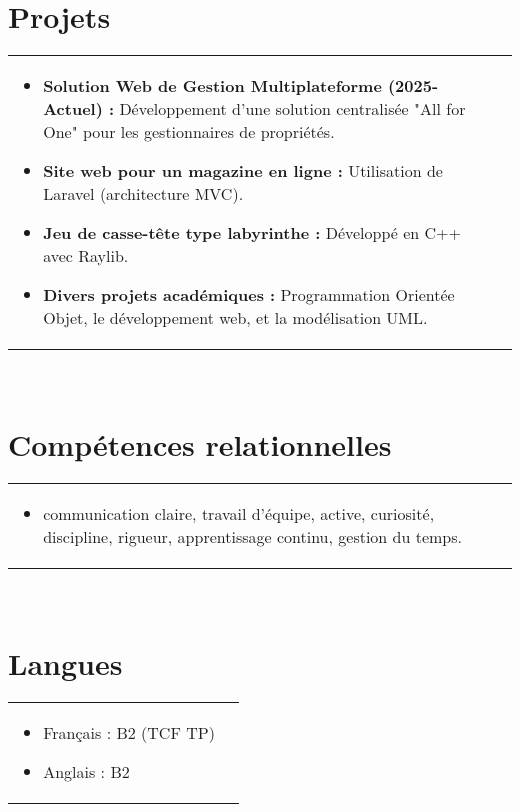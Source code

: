 \documentclass[a4paper,8pt]{article}
\begin{document}
\section{Projets}
\begin{tabularx}{\linewidth}{ @{}l r@{} }
\begin{minipage}[t]{\linewidth}
    \begin{itemize}[nosep,after=\strut, leftmargin=2em, itemsep=2pt]
        \item \textbf{Solution Web de Gestion Multiplateforme (2025-Actuel) :} Développement d'une solution centralisée "All for One" pour les gestionnaires de propriétés.
        \item \textbf{Site web pour un magazine en ligne :} Utilisation de Laravel (architecture MVC).
        \item \textbf{Jeu de casse-tête type labyrinthe :} Développé en C++ avec Raylib.
        \item \textbf{Divers projets académiques :} Programmation Orientée Objet, le développement web, et la modélisation UML.
    \end{itemize}
\end{minipage}
\end{tabularx}
\\
\section{Compétences relationnelles}
\begin{tabularx}{\linewidth}{ @{}l r@{} }
\begin{minipage}[t]{\linewidth}
    \begin{itemize}[leftmargin=2em, itemsep=2pt]
        \item communication claire, travail d'équipe, active, curiosité, discipline, rigueur, apprentissage continu, gestion du temps.
    \end{itemize}
\end{minipage}
\end{tabularx}
\\
\section{Langues}
\begin{tabularx}{\linewidth}{ @{}l r@{} }
\begin{minipage}[t]{\linewidth}
    \begin{itemize}[nosep,after=\strut, leftmargin=2em, itemsep=2pt]
        \item Français : B2 (TCF TP)
        \item Anglais : B2
    \end{itemize}
\end{minipage}
\end{tabularx}
\\
\end{document}
